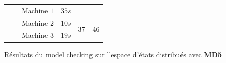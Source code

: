 \begin{tableth}
\begin{tabular}{|c|c|c||c||c|c|  }
		                            &                                        & Machine $1$ &      $35 s$       &                        &                        \\ \cline{3-4}\cline{4-6}
		                            &                                        & Machine $2$ &      $10 s$       &  \multirow{2}{*}{37 }  &  \multirow{2}{*}{46 }  \\ \cline{3-4}
		                            &                                        & Machine $3$ &      $19 s$       &                        &                        \\ \hline\hline
	\end{tabular}
	\caption{Résultats du model checking sur l'espace d'états distribués avec \textbf{MD5} }\label{tablea1}
\end{tableth}

